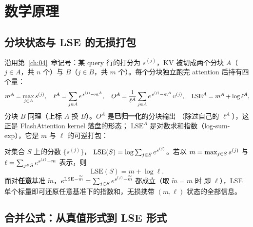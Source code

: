 \section{数学原理}

\subsection{分块状态与 LSE 的无损打包}

沿用第~\ref{ch:04}~章记号：某 query 行的打分为 $s^{(j)}$，KV 被切成两个分块
$A$（$j \in A$，共 $n$ 个）与 $B$（$j \in B$，共 $m$ 个）。每个分块独立跑完
attention 后持有四个量：
\begin{equation}
  m^{A} = \max\sb{j \in A} s^{(j)}, \quad
  \ell^{A} = \sum\sb{j \in A} e^{\,s^{(j)} - m^{A}}, \quad
  O^{A} = \frac{1}{\ell^{A}} \sum\sb{j \in A} e^{\,s^{(j)} - m^{A}}\, v^{(j)}, \quad
  \mathrm{LSE}^{A} = m^{A} + \log \ell^{A},
  \label{eq:5-chunk-state}
\end{equation}
分块 $B$ 同理（上标 $A$ 换 $B$）。$O^{A}$ 是\textbf{已归一化}的分块输出
（除过自己的 $\ell^{A}$），这正是 FlashAttention kernel 落盘的形态；
$\mathrm{LSE}^{A}$ 是对数求和指数（log-sum-exp），它是 $m$ 与 $\ell$ 的可逆打包：

\begin{definition}[LSE]\label{def:lse}
  对集合 $S$ 上的分数 $\{s^{(j)}\}$，
  $\mathrm{LSE}(S) = \log \sum\sb{j \in S} e^{s^{(j)}}$。若以 $m = \max\sb{j\in S} s^{(j)}$
  与 $\ell = \sum\sb{j \in S} e^{s^{(j)} - m}$ 表示，则
  \begin{equation}
    \mathrm{LSE}(S) = m + \log \ell .
    \label{eq:5-lse-def}
  \end{equation}
  而对\textbf{任意}基准 $\tilde m$，$e^{\mathrm{LSE} - \tilde m}
  = \sum\sb{j \in S} e^{s^{(j)} - \tilde m}$ 都成立（取 $\tilde m = m$ 时
  即 $\ell$），LSE 单个标量即可还原任意基准下的指数和，无损携带
  $(m, \ell)$ 状态的全部信息。
\end{definition}

\subsection{合并公式：从真值形式到 LSE 形式}

